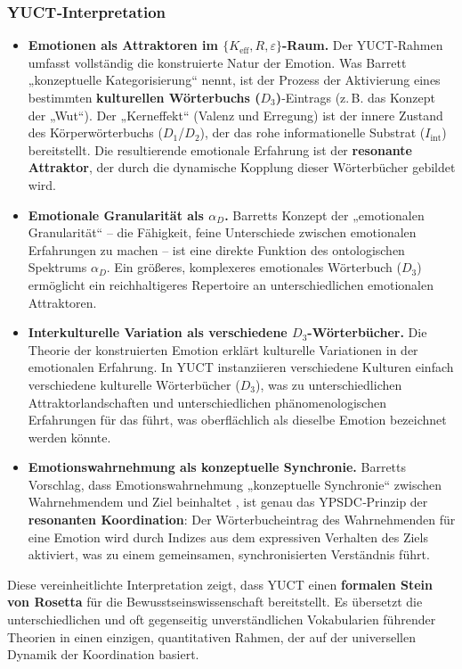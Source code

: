 \documentclass[12pt,a4paper]{article}
\begin{document}
	\subsubsection*{YUCT‑Interpretation}
	\begin{itemize}
		\item \textbf{Emotionen als Attraktoren im \(\{K_{\mathrm{eff}}, R, \varepsilon\}\)-Raum.} Der YUCT‑Rahmen umfasst vollständig die konstruierte Natur der Emotion. Was Barrett „konzeptuelle Kategorisierung“ nennt, ist der Prozess der Aktivierung eines bestimmten \textbf{kulturellen Wörterbuchs (\(D_3\))}‑Eintrags (z. B. das Konzept der „Wut“). Der „Kerneffekt“ (Valenz und Erregung) ist der innere Zustand des Körperwörterbuchs (\(D_1\)/\(D_2\)), der das rohe informationelle Substrat (\(I_{\mathrm{int}}\)) bereitstellt. Die resultierende emotionale Erfahrung ist der \textbf{resonante Attraktor}, der durch die dynamische Kopplung dieser Wörterbücher gebildet wird.
		\item \textbf{Emotionale Granularität als \(\alpha_D\).} Barretts Konzept der „emotionalen Granularität“ – die Fähigkeit, feine Unterschiede zwischen emotionalen Erfahrungen zu machen \cite{Barrett2025} – ist eine direkte Funktion des ontologischen Spektrums \(\alpha_D\). Ein größeres, komplexeres emotionales Wörterbuch (\(D_3\)) ermöglicht ein reichhaltigeres Repertoire an unterschiedlichen emotionalen Attraktoren.
		\item \textbf{Interkulturelle Variation als verschiedene \(D_3\)-Wörterbücher.} Die Theorie der konstruierten Emotion erklärt kulturelle Variationen in der emotionalen Erfahrung. In YUCT instanziieren verschiedene Kulturen einfach verschiedene kulturelle Wörterbücher (\(D_3\)), was zu unterschiedlichen Attraktorlandschaften und unterschiedlichen phänomenologischen Erfahrungen für das führt, was oberflächlich als dieselbe Emotion bezeichnet werden könnte.
		\item \textbf{Emotionswahrnehmung als konzeptuelle Synchronie.} Barretts Vorschlag, dass Emotionswahrnehmung „konzeptuelle Synchronie“ zwischen Wahrnehmendem und Ziel beinhaltet \cite{Gendron2018}, ist genau das YPSDC‑Prinzip der \textbf{resonanten Koordination}: Der Wörterbucheintrag des Wahrnehmenden für eine Emotion wird durch Indizes aus dem expressiven Verhalten des Ziels aktiviert, was zu einem gemeinsamen, synchronisierten Verständnis führt.
	\end{itemize}
	
	Diese vereinheitlichte Interpretation zeigt, dass YUCT einen \textbf{formalen Stein von Rosetta} für die Bewusstseinswissenschaft bereitstellt. Es übersetzt die unterschiedlichen und oft gegenseitig unverständlichen Vokabularien führender Theorien in einen einzigen, quantitativen Rahmen, der auf der universellen Dynamik der Koordination basiert.
	
\end{document}
